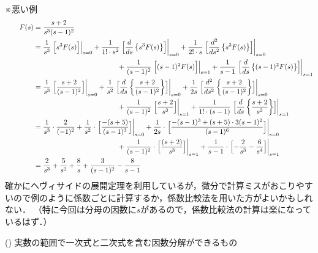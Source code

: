 \documentclass[a4paper,12pt]{report}
\begin{document}
※悪い例
\begin{align*}
  \qquad F(s) &= \frac{s+2}{s^3(s-1)^2} \\
      &= \frac{1}{s^3}\left.\Bigl[s^3F(s)\Bigr]\right|_{s=0} 
          + \frac{1}{1! \cdot s^2}\left.\Bigl[\frac{d}{ds} \left\{s^3F(s)\right\}\Bigr]\right|_{s=0}
          + \frac{1}{2! \cdot s}\left.\Bigl[\frac{d^2}{ds^2} \left\{s^3F(s)\right\}\Bigr]\right|_{s=0}\\
      & \qquad \qquad \qquad \qquad \qquad \qquad 
      + \frac{1}{(s-1)^2}\left.\Bigl[(s-1)^2F(s)\Bigr]\right|_{s=1}
      + \frac{1}{s-1}\left.\Bigl[\frac{d}{ds}\left\{(s-1)^2F(s)\right\}\Bigr]\right|_{s=1}\\
      &= \frac{1}{s^3}\left.\Bigl[\frac{s+2}{(s-1)^2}\Bigr]\right|_{s=0} 
          + \frac{1}{s^2}\left.\Bigl[\frac{d}{ds} \left\{\frac{s+2}{(s-1)^2}\right\}\Bigr]\right|_{s=0}
          + \frac{1}{2s}\left.\Bigl[\frac{d^2}{ds^2} \left\{\frac{s+2}{(s-1)^2}\right\}\Bigr]\right|_{s=0}\\
      & \qquad \qquad \qquad \qquad \qquad \qquad 
      + \frac{1}{(s-1)^2}\left.\Bigl[\frac{s+2}{s^3}\Bigr]\right|_{s=1}
      + \frac{1}{1! \cdot (s-1)}\left.\Bigl[\frac{d}{ds}\left\{\frac{s+2}{s^3}\right\}\Bigr]\right|_{s=1}\\
      &= \frac{1}{s^3}\cdot\frac{2}{(-1)^2}
          + \frac{1}{s^2}\cdot \left.\Bigl[\frac{-(s+5)}{(s-1)^3}\Bigr]\right|_{s=0}
          + \frac{1}{2s}\cdot \left.\Bigl[\frac{-(s-1)^3+(s+5)\cdot3(s-1)^2}{(s-1)^6}\Bigr]\right|_{s=0}\\
      & \qquad \qquad \qquad \qquad \qquad \qquad 
          + \frac{1}{(s-1)^2}\cdot \left.\Bigl[\frac{(s+2)}{s^3}\Bigr]\right|_{s=1}
          + \frac{1}{s-1}\cdot \left.\Bigl[-\frac{2}{s^3}-\frac{6}{s^4}\Bigr]\right|_{s=1} \\
      &= \frac{2}{s^3} 
      + \frac{5}{s^2}
      + \frac{8}{s}
      + \frac{3}{(s-1)^2}
      - \frac{8}{s-1}\\
\end{align*}
確かにヘヴィサイドの展開定理を利用しているが，微分で計算ミスがおこりやすいので例のように係数ごとに計算するか，係数比較法を用いた方がよいかもしれない．
（特に今回は分母の因数に\(s\)があるので，係数比較法の計算は楽になっているはず．）

\newpage

    (\MakeUppercase{}) 実数の範囲で一次式と二次式を含む因数分解ができるもの \\
\end{document}
